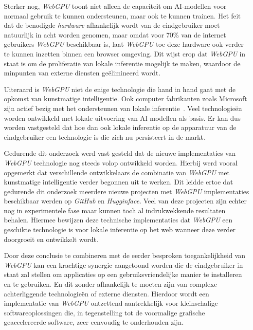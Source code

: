 \bigbreak{}

Sterker nog, \textit{WebGPU} toont niet alleen de capaciteit om  AI-modellen voor normaal gebruik te kunnen ondersteunen, maar ook te kunnen trainen. Het feit dat de benodigde \textit{hardware} afhankelijk wordt van de eindgebruiker moet natuurlijk in acht worden genomen, maar omdat voor 70\% van de internet gebruikers \textit{WebGPU} beschikbaar is, laat \textit{WebGPU} toe deze hardware ook verder te kunnen inzetten binnen een browser omgeving. Dit wijst erop dat \textit{WebGPU} in staat is om de proliferatie van lokale inferentie mogelijk te maken, waardoor de minpunten van externe diensten geëlimineerd wordt.

\bigbreak{}

Uiteraard is \textit{WebGPU} niet de enige technologie die hand in hand gaat met de opkomst van kunstmatige intelligentie. Ook computer fabrikanten zoals Microsoft zijn actief bezig met het ondersteunen van lokale inferentie~\autocite{Mehdi2024}. Veel technologieën worden ontwikkeld met lokale uitvoering van AI-modellen als basis. Er kan dus worden vastgesteld dat hoe dan ook lokale inferentie op de apparatuur van de eindgebruiker een technologie is die zich nu persisteert in de markt.

\bigbreak{}

Gedurende dit onderzoek werd vast gesteld dat de nieuwe implementaties van \textit{WebGPU} technologie nog steeds volop ontwikkeld worden. Hierbij werd vooral opgemerkt dat verschillende ontwikkelaars de combinatie van \textit{WebGPU} met kunstmatige intelligentie verder begonnen uit te werken. Dit leidde ertoe dat gedurende dit onderzoek meerdere nieuwe projecten met \textit{WebGPU} implementaties beschikbaar werden op \textit{GitHub} en \textit{Hugginface}. Veel van deze projecten zijn echter nog in experimentele fase maar kunnen toch al indrukwekkende resultaten behalen. Hiermee bewijzen deze technische implementaties dat \textit{WebGPU} een geschikte technologie is voor lokale inferentie op het web wanneer deze verder doorgroeit en ontwikkelt wordt. 

\bigbreak{}

Door deze conclusie te combineren met de eerder besproken toegankelijkheid van \textit{WebGPU} kan een krachtige synergie aangetoond worden die de eindgebruiker in staat zal stellen om applicaties op een gebruiksvriendelijke manier te installeren en te gebruiken. En dit zonder afhankelijk te moeten zijn van complexe achterliggende technologieën of externe diensten. Hierdoor wordt een implementatie van \textit{WebGPU} ontzettend aantrekkelijk voor kleinschalige softwareoplossingen die, in tegenstelling tot de voormalige grafische geaccelereerde software, zeer eenvoudig te onderhouden zijn.

